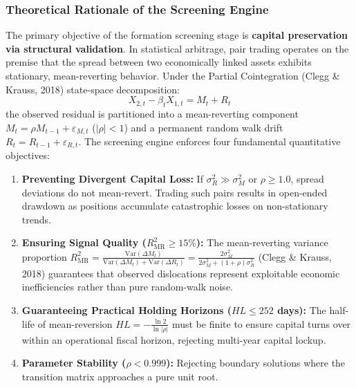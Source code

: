 \documentclass[11pt, a4paper]{article}
\begin{document}
\subsubsection{Theoretical Rationale of the Screening Engine}
The primary objective of the formation screening stage is \textbf{capital preservation via structural validation}. In statistical arbitrage, pair trading operates on the premise that the spread between two economically linked assets exhibits stationary, mean-reverting behavior. Under the Partial Cointegration (Clegg \& Krauss, 2018) state-space decomposition:
\begin{equation}
    X_{2,t} - \beta_t X_{1,t} = M_t + R_t
\end{equation}
the observed residual is partitioned into a mean-reverting component $M_t = \rho M_{t-1} + \varepsilon_{M,t}$ ($|\rho| < 1$) and a permanent random walk drift $R_t = R_{t-1} + \varepsilon_{R,t}$. The screening engine enforces four fundamental quantitative objectives:
\begin{enumerate}
    \item \textbf{Preventing Divergent Capital Loss:} If $\sigma_R^2 \gg \sigma_M^2$ or $\rho \ge 1.0$, spread deviations do not mean-revert. Trading such pairs results in open-ended drawdown as positions accumulate catastrophic losses on non-stationary trends.
    \item \textbf{Ensuring Signal Quality ($R^2_{\text{MR}} \ge 15\%$):} The mean-reverting variance proportion $R^2_{\text{MR}} = \frac{\text{Var}(\Delta M_t)}{\text{Var}(\Delta M_t) + \text{Var}(\Delta R_t)} = \frac{2\sigma_M^2}{2\sigma_M^2 + (1+\rho)\sigma_R^2}$ (Clegg \& Krauss, 2018) guarantees that observed dislocations represent exploitable economic inefficiencies rather than pure random-walk noise.
    \item \textbf{Guaranteeing Practical Holding Horizons ($HL \le 252$ days):} The half-life of mean-reversion $HL = -\frac{\ln 2}{\ln |\rho|}$ must be finite to ensure capital turns over within an operational fiscal horizon, rejecting multi-year capital lockup.
    \item \textbf{Parameter Stability ($\rho < 0.999$):} Rejecting boundary solutions where the transition matrix approaches a pure unit root.
\end{enumerate}
\end{document}

